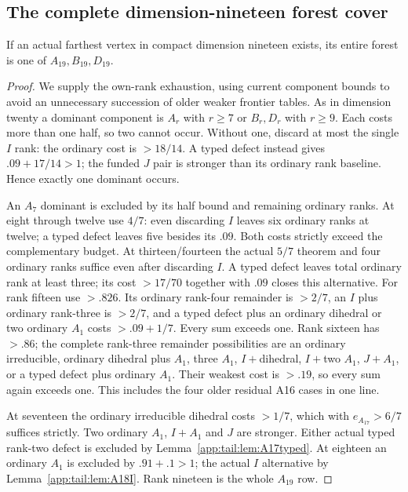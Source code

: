 \subsection{The complete dimension-nineteen forest cover}
\begin{proposition}\label{app:tail:prop:exact19cover}
If an actual farthest vertex in compact dimension nineteen exists,
its entire forest is one of $A_{19},B_{19},D_{19}$.
\end{proposition}
\begin{proof}
We supply the own-rank exhaustion, using current component bounds
to avoid an unnecessary succession of older weaker frontier tables.
As in dimension twenty a dominant component is $A_r$ with
$r\ge7$ or $B_r,D_r$ with $r\ge9$.
Each costs more than one half, so two cannot occur. Without
one, discard at most the single $I$ rank: the ordinary cost
is $>18/14$. A typed defect instead gives
$.09+17/14>1$; the funded $J$ pair is stronger than its
ordinary rank baseline. Hence exactly one dominant occurs.

An $A_7$ dominant is excluded by its half bound and remaining
ordinary ranks. At eight through twelve use $4/7$:
even discarding $I$ leaves six ordinary ranks at twelve;
a typed defect leaves five besides its $.09$. Both costs
strictly exceed the complementary budget.
At thirteen/fourteen the actual $5/7$ theorem and four
ordinary ranks suffice even after discarding $I$.
A typed defect leaves total ordinary rank at least three;
its cost $>17/70$ together with $.09$ closes this alternative.
For rank fifteen use $>.826$. Its ordinary rank-four
remainder is $>2/7$, an $I$ plus ordinary rank-three is
$>2/7$, and a typed defect plus an ordinary dihedral or
two ordinary $A_1$ costs $>.09+1/7$.
Every sum exceeds one. Rank sixteen has $>.86$;
the complete rank-three remainder possibilities are an
ordinary irreducible, ordinary dihedral plus $A_1$, three
$A_1$, $I+$dihedral, $I+$two $A_1$, $J+A_1$, or a typed
defect plus ordinary $A_1$.
Their weakest cost is $>.19$, so every sum again exceeds one.
This includes the four older residual A16 cases in one line.

At seventeen the ordinary irreducible dihedral costs $>1/7$,
which with $e_{A_{17}}>6/7$ suffices strictly. Two ordinary
$A_1$, $I+A_1$ and $J$ are stronger. Either actual typed
rank-two defect is excluded by Lemma~\ref{app:tail:lem:A17typed}.
At eighteen an ordinary $A_1$ is excluded by $.91+.1>1$;
the actual $I$ alternative by Lemma~\ref{app:tail:lem:A18I}.
Rank nineteen is the whole $A_{19}$ row.


\end{proof}
